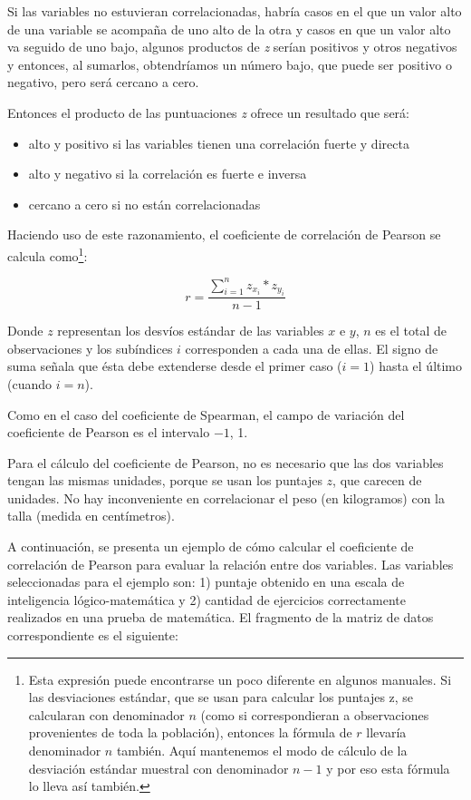 \documentclass[]{book}
\let\rmarkdownfootnote\footnote%
\def\footnote{\protect\rmarkdownfootnote}
\begin{document}
Si las variables no estuvieran correlacionadas, habría casos en el que
un valor alto de una variable se acompaña de uno alto de la otra y casos
en que un valor alto va seguido de uno bajo, algunos productos de \emph{z}
serían positivos y otros negativos y entonces, al sumarlos, obtendríamos
un número bajo, que puede ser positivo o negativo, pero será cercano a
cero.

Entonces el producto de las puntuaciones \emph{z} ofrece un resultado que será:

\begin{itemize}
\item
  alto y positivo si las variables tienen una correlación fuerte y directa
\item
  alto y negativo si la correlación es fuerte e inversa
\item
  cercano a cero si no están correlacionadas
\end{itemize}

Haciendo uso de este razonamiento, el coeficiente de correlación de
Pearson se calcula como\footnote{Esta expresión puede encontrarse un poco diferente en algunos manuales. Si las desviaciones estándar, que se usan para calcular los puntajes z, se calcularan con denominador \(n\) (como si correspondieran a observaciones provenientes de toda la población), entonces la fórmula de \(r\) llevaría denominador \(n\) también. Aquí mantenemos el modo de cálculo de la desviación estándar muestral con denominador \(n-1\) y por eso esta fórmula lo lleva así también.}:

\[r = \frac{\sum_{i = 1}^{n}{z_{x_{i}}*z_{y_{i}}}}{n - 1}\]

Donde \(z\) representan los desvíos estándar de las variables \(x\) e \(y\), \(n\) es el total de observaciones y los subíndices \(i\) corresponden a cada una de ellas. El signo de suma señala que ésta debe extenderse desde el primer caso (\(i=1\)) hasta el último (cuando \(i=n\)).

Como en el caso del coeficiente de Spearman, el campo de variación del coeficiente de Pearson es el intervalo \(-1\), 1.

Para el cálculo del coeficiente de Pearson, no es necesario que las dos variables tengan las mismas unidades, porque se usan los puntajes \(z\), que carecen de unidades. No hay inconveniente en correlacionar el peso (en kilogramos) con la talla (medida en centímetros).

A continuación, se presenta un ejemplo de cómo calcular el coeficiente
de correlación de Pearson para evaluar la relación entre dos variables.
Las variables seleccionadas para el ejemplo son: 1) puntaje obtenido en
una escala de inteligencia lógico-matemática y 2) cantidad de ejercicios
correctamente realizados en una prueba de matemática. El fragmento de la
matriz de datos correspondiente es el siguiente:
\end{document}
